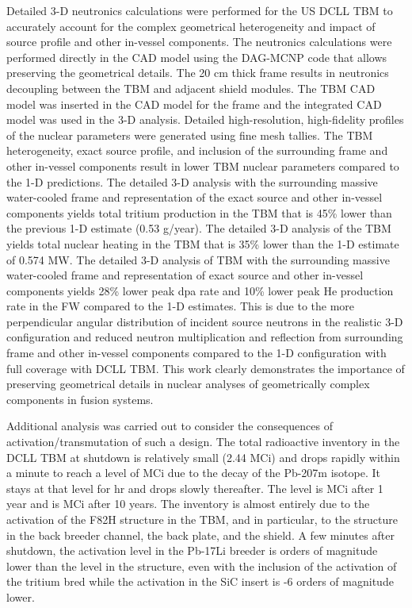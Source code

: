 Detailed 3-D neutronics calculations were performed for the US \gls{DCLL}
\gls{TBM} to accurately account for the complex geometrical heterogeneity and
impact of source profile and other in-vessel components. The neutronics
calculations were performed directly in the \gls{CAD} model using the DAG-MCNP
code that allows preserving the geometrical details. The 20 cm thick frame
results in neutronics decoupling between the \gls{TBM} and adjacent shield
modules. The \gls{TBM} \gls{CAD} model was inserted in the \gls{CAD} model for
the frame and the integrated \gls{CAD} model was used in the 3-D
analysis. Detailed high-resolution, high-fidelity profiles of the nuclear
parameters were generated using fine mesh tallies. The \gls{TBM}
heterogeneity, exact source profile, and inclusion of the surrounding frame
and other in-vessel components result in lower \gls{TBM} nuclear parameters
compared to the 1-D predictions. The detailed 3-D analysis with the
surrounding massive water-cooled frame and representation of the exact source
and other in-vessel components yields total tritium production in the TBM that
is 45\% lower than the previous 1-D estimate (0.53 g/year). The detailed 3-D
analysis of the \gls{TBM} yields total nuclear heating in the \gls{TBM} that
is 35\% lower than the 1-D estimate of 0.574 MW. The detailed 3-D analysis of
TBM with the surrounding massive water-cooled frame and representation of
exact source and other in-vessel components yields 28\% lower peak dpa rate
and 10\% lower peak He production rate in the \gls{FW} compared to the 1-D
estimates. This is due to the more perpendicular angular distribution of
incident source neutrons in the realistic 3-D configuration and reduced
neutron multiplication and reflection from surrounding frame and other
in-vessel components compared to the 1-D configuration with full coverage with
\gls{DCLL} \gls{TBM}. This work clearly demonstrates the importance of
preserving geometrical details in nuclear analyses of geometrically complex
components in fusion systems.


Additional analysis was carried out to consider the consequences of
activation/transmutation of such a design.  The total radioactive inventory in
the \gls{DCLL} \gls{TBM} at shutdown is relatively small (2.44 MCi) and drops
rapidly within a minute to reach a level of  MCi due to the
decay of the Pb-207m isotope. It stays at that level for  hr and
drops slowly thereafter. The level is  MCi after 1 year and is
 MCi after 10 years. The inventory is almost entirely due to
the activation of the F82H structure in the \gls{TBM}, and in particular, to
the structure in the back breeder channel, the back plate, and the shield. A
few minutes after shutdown, the activation level in the Pb-17Li breeder is
 orders of magnitude lower than the level in the structure, even
with the inclusion of the activation of the tritium bred while the activation
in the SiC insert is -6 orders of magnitude lower.

